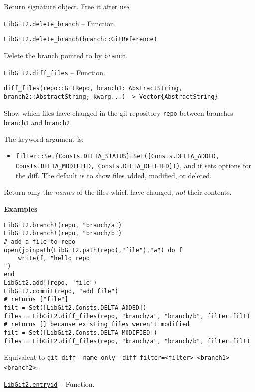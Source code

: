 \begin{adjustwidth}{2em}{0pt}

Return signature object. Free it after use.



\end{adjustwidth}
\hypertarget{3338994964608738996}{}
\hyperlink{3338994964608738996}{\texttt{LibGit2.delete\_branch}}  -- {Function.}

\begin{adjustwidth}{2em}{0pt}


\begin{verbatim}
LibGit2.delete_branch(branch::GitReference)
\end{verbatim}

Delete the branch pointed to by \texttt{branch}.



\end{adjustwidth}
\hypertarget{15514326201827332376}{}
\hyperlink{15514326201827332376}{\texttt{LibGit2.diff\_files}}  -- {Function.}

\begin{adjustwidth}{2em}{0pt}


\begin{verbatim}
diff_files(repo::GitRepo, branch1::AbstractString, branch2::AbstractString; kwarg...) -> Vector{AbstractString}
\end{verbatim}

Show which files have changed in the git repository \texttt{repo} between branches \texttt{branch1} and \texttt{branch2}.

The keyword argument is:

\begin{itemize}
\item \texttt{filter::Set\{Consts.DELTA\_STATUS\}=Set([Consts.DELTA\_ADDED, Consts.DELTA\_MODIFIED, Consts.DELTA\_DELETED]))}, and it sets options for the diff. The default is to show files added, modified, or deleted.

\end{itemize}
Return only the \emph{names} of the files which have changed, \emph{not} their contents.

\textbf{Examples}


\begin{verbatim}
LibGit2.branch!(repo, "branch/a")
LibGit2.branch!(repo, "branch/b")
# add a file to repo
open(joinpath(LibGit2.path(repo),"file"),"w") do f
    write(f, "hello repo
")
end
LibGit2.add!(repo, "file")
LibGit2.commit(repo, "add file")
# returns ["file"]
filt = Set([LibGit2.Consts.DELTA_ADDED])
files = LibGit2.diff_files(repo, "branch/a", "branch/b", filter=filt)
# returns [] because existing files weren't modified
filt = Set([LibGit2.Consts.DELTA_MODIFIED])
files = LibGit2.diff_files(repo, "branch/a", "branch/b", filter=filt)
\end{verbatim}

Equivalent to \texttt{git diff --name-only --diff-filter=<filter> <branch1> <branch2>}.



\end{adjustwidth}
\hypertarget{13732663441533972746}{}
\hyperlink{13732663441533972746}{\texttt{LibGit2.entryid}}  -- {Function.}

